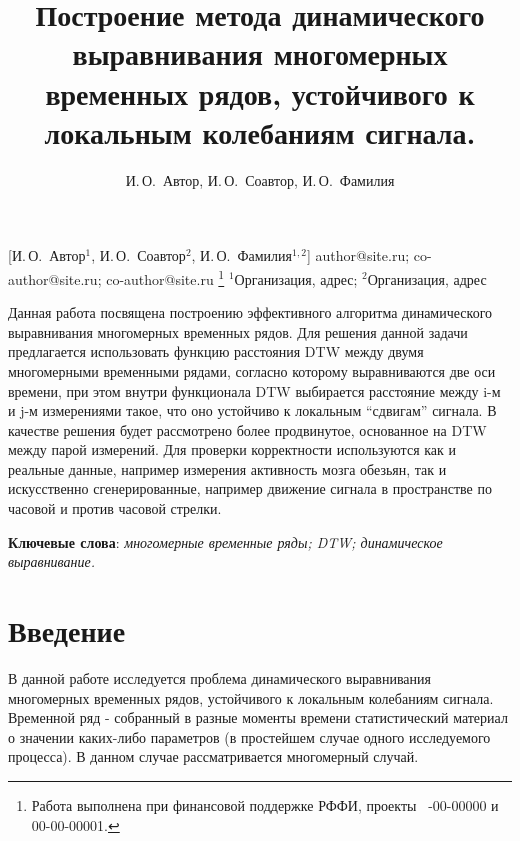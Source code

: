 \documentclass[12pt, twoside]{article}
\begin{document}

\title
    [Шаблон статьи для публикации] %
    {Построение метода динамического выравнивания многомерных временных рядов, устойчивого к локальным колебаниям сигнала.}
\author
    [И.\,О.~Автор] %
    {И.\,О.~Автор, И.\,О.~Соавтор, И.\,О.~Фамилия} %
    [И.\,О.~Автор$^1$, И.\,О.~Соавтор$^2$, И.\,О.~Фамилия$^{1,2}$] %
\email
    {author@site.ru; co-author@site.ru;  co-author@site.ru}
\thanks
    {Работа выполнена при
     финансовой поддержке РФФИ, проекты \No\ -00-00000 и 00-00-00001.}
\organization
    {$^1$Организация, адрес; $^2$Организация, адрес}
\abstract
    {Данная работа посвящена построению эффективного алгоритма динамического выравнивания многомерных временных рядов. Для решения данной задачи предлагается использовать функцию расстояния DTW между двумя многомерными временными рядами, согласно которому выравниваются две оси времени, при этом внутри функционала DTW выбирается расстояние между i-м и j-м измерениями такое, что оно устойчиво к локальным “сдвигам” сигнала. В качестве решения будет рассмотрено более продвинутое, основанное на DTW между парой измерений. Для проверки корректности используются как и реальные данные, например измерения активность мозга обезьян, так и искусственно сгенерированные, например движение сигнала в пространстве по часовой и против часовой стрелки.
	
\bigskip
\noindent
\textbf{Ключевые слова}: \emph {многомерные временные ряды; DTW; динамическое выравнивание.}
}

\maketitle
\linenumbers

\section{Введение}

В данной работе исследуется проблема динамического выравнивания многомерных временных рядов, устойчивого к локальным колебаниям сигнала.
Временной ряд -  собранный в разные моменты времени статистический материал о значении каких-либо параметров (в простейшем случае одного исследуемого процесса). В данном случае рассматривается многомерный случай.
\end{document}
